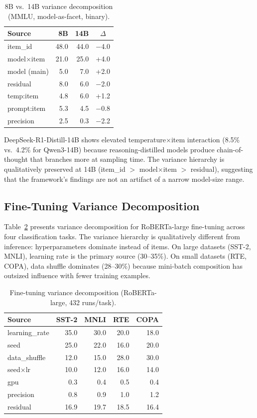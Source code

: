 \documentclass[11pt,twocolumn]{article}
\begin{document}
\begin{table}[t]
\centering
\caption{8B vs.\ 14B variance decomposition (MMLU, model-as-facet, binary).}
\label{tab:scale}
\small
\begin{tabular}{@{}lrrc@{}}
\toprule
Source & 8B & 14B & $\Delta$ \\
\midrule
item\_id & 48.0 & 44.0 & $-$4.0 \\
model$\times$item & 21.0 & 25.0 & +4.0 \\
model (main) & 5.0 & 7.0 & +2.0 \\
residual & 8.0 & 6.0 & $-$2.0 \\
temp:item & 4.8 & 6.0 & +1.2 \\
prompt:item & 5.3 & 4.5 & $-$0.8 \\
precision & 2.5 & 0.3 & $-$2.2 \\
\bottomrule
\end{tabular}
\end{table}

DeepSeek-R1-Distill-14B shows elevated temperature$\times$item interaction (8.5\% vs.\ 4.2\% for Qwen3-14B) because reasoning-distilled models produce chain-of-thought that branches more at sampling time. The variance hierarchy is qualitatively preserved at 14B (item\_id $>$ model$\times$item $>$ residual), suggesting that the framework's findings are not an artifact of a narrow model-size range.

\subsection{Fine-Tuning Variance Decomposition}
\label{sec:finetuning}

Table~\ref{tab:finetune} presents variance decomposition for RoBERTa-large fine-tuning across four classification tasks. The variance hierarchy is qualitatively different from inference: hyperparameters dominate instead of items. On large datasets (SST-2, MNLI), learning rate is the primary source (30--35\%). On small datasets (RTE, COPA), data shuffle dominates (28--30\%) because mini-batch composition has outsized influence with fewer training examples.

\begin{table}[t]
\centering
\caption{Fine-tuning variance decomposition (RoBERTa-large, 432 runs/task).}
\label{tab:finetune}
\small
\begin{tabular}{@{}lrrrr@{}}
\toprule
Source & SST-2 & MNLI & RTE & COPA \\
\midrule
learning\_rate & 35.0 & 30.0 & 20.0 & 18.0 \\
seed & 25.0 & 22.0 & 16.0 & 20.0 \\
data\_shuffle & 12.0 & 15.0 & 28.0 & 30.0 \\
seed$\times$lr & 10.0 & 12.0 & 16.0 & 14.0 \\
gpu & 0.3 & 0.4 & 0.5 & 0.4 \\
precision & 0.8 & 0.9 & 1.0 & 1.2 \\
residual & 16.9 & 19.7 & 18.5 & 16.4 \\
\bottomrule
\end{tabular}
\end{table}
\end{document}
